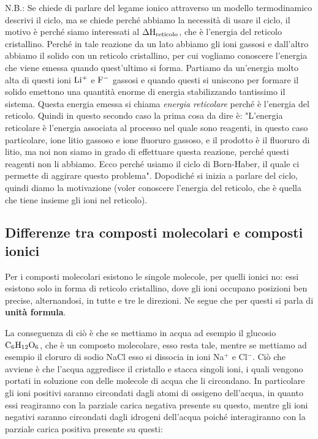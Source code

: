 \vspace{0.2cm}N.B.: Se chiede di parlare del legame ionico attraverso un modello termodinamico descrivi il ciclo, ma se chiede perché abbiamo la necessità di usare il ciclo, il motivo è perché siamo interessati al $\Delta\rm{H}_{reticolo}$, che è l'energia del reticolo cristallino. Perché in tale reazione da un lato abbiamo gli ioni gassosi e dall'altro abbiamo il solido con un reticolo cristallino, per cui vogliamo conoscere l'energia che viene emessa quando quest'ultimo si forma. Partiamo da un'energia molto alta di questi ioni $\rm Li^+$ e $\rm F^-$ gassosi e quando questi si uniscono per formare il solido emettono una quantità enorme di energia stabilizzando tantissimo il sistema. Questa energia emessa si chiama \textit{energia reticolare} perché è l'energia del reticolo. Quindi in questo secondo caso la prima cosa da dire è: "L'energia reticolare è l'energia associata al processo nel quale sono reagenti, in questo caso particolare, ione litio gassoso e ione fluoruro gassoso, e il prodotto è il fluoruro di litio, ma noi non siamo in grado di effettuare questa reazione, perché questi reagenti non li abbiamo. Ecco perché usiamo il ciclo di Born-Haber, il quale ci permette di aggirare questo problema". Dopodiché si inizia a parlare del ciclo, quindi diamo la motivazione (voler conoscere l'energia del reticolo, che è quella che tiene insieme gli ioni nel reticolo).

\subsection{Differenze tra composti molecolari e composti ionici}
Per i composti molecolari esistono le singole molecole, per quelli ionici no: essi esistono solo in forma di reticolo cristallino, dove gli ioni occupano posizioni ben precise, alternandosi, in tutte e tre le direzioni. Ne segue che per questi si parla di \textbf{unità formula}.

La conseguenza di ciò è che se mettiamo in acqua ad esempio il glucosio $\rm C_6H_{12}O_6$, che è un composto molecolare, esso resta tale, mentre se mettiamo ad esempio il cloruro di sodio NaCl esso si dissocia in ioni Na$^+$ e Cl$^-$. Ciò che avviene è che l'acqua aggredisce il cristallo e stacca singoli ioni, i quali vengono portati in soluzione con delle molecole di acqua che li circondano. In particolare gli ioni positivi saranno circondati dagli atomi di ossigeno dell'acqua, in quanto essi reagiranno con la parziale carica negativa presente su questo, mentre gli ioni negativi saranno circondati dagli idrogeni dell'acqua poiché interagiranno con la parziale carica positiva presente su questi:

